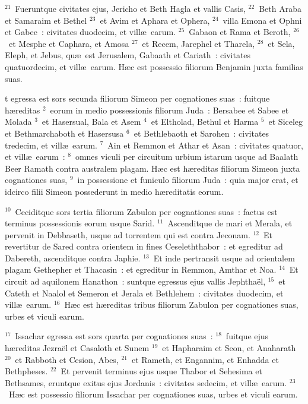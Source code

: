 ${}^{21}$~Fueruntque civitates ejus, Jericho et Beth Hagla et vallis Casis,
${}^{22}$~Beth Araba et Samaraim et Bethel
${}^{23}$~et Avim et Aphara et Ophera,
${}^{24}$~villa Emona et Ophni et Gabee~: civitates duodecim, et vill\ae\ earum.
${}^{25}$~Gabaon et Rama et Beroth,
${}^{26}$~et Mesphe et Caphara, et Amosa
${}^{27}$~et Recem, Jarephel et Tharela,
${}^{28}$~et Sela, Eleph, et Jebus, qu\ae\ est Jerusalem, Gabaath et Cariath~: civitates quatuordecim, et vill\ae\ earum. H\ae c est possessio filiorum Benjamin juxta familias suas.

\bchapter
{}t egressa est sors secunda filiorum Simeon per cognationes suas~: fuitque h\ae reditas
${}^{2}$~eorum in medio possessionis filiorum Juda~: Bersabee et Sabee et Molada
${}^{3}$~et Hasersual, Bala et Asem
${}^{4}$~et Eltholad, Bethul et Harma
${}^{5}$~et Siceleg et Bethmarchaboth et Hasersusa
${}^{6}$~et Bethlebaoth et Sarohen~: civitates tredecim, et vill\ae\ earum.
${}^{7}$~Ain et Remmon et Athar et Asan~: civitates quatuor, et vill\ae\ earum~:
${}^{8}$~omnes viculi per circuitum urbium istarum usque ad Baalath Beer Ramath contra australem plagam. H\ae c est h\ae reditas filiorum Simeon juxta cognationes suas,
${}^{9}$~in possessione et funiculo filiorum Juda~: quia major erat, et idcirco filii Simeon possederunt in medio h\ae reditatis eorum.


${}^{10}$~Ceciditque sors tertia filiorum Zabulon per cognationes suas~: factus est terminus possessionis eorum usque Sarid.
${}^{11}$~Ascenditque de mari et Merala, et pervenit in Debbaseth, usque ad torrentem qui est contra Jeconam.
${}^{12}$~Et revertitur de Sared contra orientem in fines Ceseleththabor~: et egreditur ad Dabereth, ascenditque contra Japhie.
${}^{13}$~Et inde pertransit usque ad orientalem plagam Gethepher et Thacasin~: et egreditur in Remmon, Amthar et Noa.
${}^{14}$~Et circuit ad aquilonem Hanathon~: suntque egressus ejus vallis Jephtha\"el,
${}^{15}$~et Cateth et Naalol et Semeron et Jerala et Bethlehem~: civitates duodecim, et vill\ae\ earum.
${}^{16}$~H\ae c est h\ae reditas tribus filiorum Zabulon per cognationes suas, urbes et viculi earum.


${}^{17}$~Issachar egressa est sors quarta per cognationes suas~:
${}^{18}$~fuitque ejus h\ae reditas Jezra\"el et Casaloth et Sunem
${}^{19}$~et Hapharaim et Seon, et Anaharath
${}^{20}$~et Rabboth et Cesion, Abes,
${}^{21}$~et Rameth, et Engannim, et Enhadda et Bethpheses.
${}^{22}$~Et pervenit terminus ejus usque Thabor et Sehesima et Bethsames, eruntque exitus ejus Jordanis~: civitates sedecim, et vill\ae\ earum.
${}^{23}$~H\ae c est possessio filiorum Issachar per cognationes suas, urbes et viculi earum.


